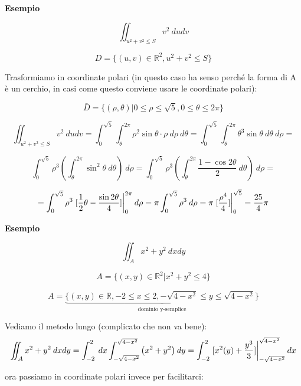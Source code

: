 \documentclass[../appunti-analisi.tex]{subfiles}
\begin{document}
%
%
%
%
%
%


\textbf{Esempio} 

\[
    \iint_{u^{2}+v^{2} \le S} {v^{2}} \: dudv 
\]

\[
    D= \{(u,v) \in \mathbb{R}^{2}, u^{2}+v^{2} \le S\}
\]

Trasformiamo in coordinate polari (in questo caso ha senso perché la forma di A è un cerchio, in casi come questo conviene usare le coordinate polari):

\[
    \bar{D} = \{(\rho,\theta) | 0 \le \rho \le \sqrt{5}, 0 \le \theta \le 2\pi\}
\]

\[
    \iint_{u^{2}+v^{2} \le S} {v ^{2}} \: dudv = \int_{0}^{\sqrt{5}} {\int_{\theta}^{2\pi} {\rho^{2} \sin \theta \cdot \rho} \: d \rho } \: d \theta = \int_{0}^{\sqrt{5}} {\int_{\theta}^{2\pi} {\theta^{3} \sin \theta} \: d \theta } \: d \rho =  
\]

\[
    \int_{0}^{\sqrt{5}} {\rho^{3} \left(\int_{\theta}^{2\pi} {\sin ^{2} \theta} \: d \theta \right)} \: d \rho = \int_{0}^{\sqrt{5}} {\rho^{3} \left( \int_{\theta}^{2\pi} { \frac{1- \cos 2 \theta}{2}} \: d \theta \right)} \: d \rho =   
\]

\[
    = \int_{0}^{\sqrt{5}} {\rho^{3} \left.[ \frac{1}{2} \theta - \frac{\sin 2 \theta}{4}]\right\rvert_{0}^{2\pi} } \: d \rho = \pi \int_{0}^{\sqrt{5}} {\rho^{3}} \: d \rho  = \pi \left.[ \frac{\rho^{4}}{4}]\right\rvert_{0}^{\sqrt{5}}  = \frac{25}{4}\pi 
\]

\textbf{Esempio} 

\[
\iint_A {x^{2}+y^{2}} \: d x d y  
\]

\[
    A = \{(x,y) \in \mathbb{R}^{2} | x^{2} + y^{2} \le 4\}
\]

\[
    A = \underbrace{\{(x,y) \in \mathbb{R}, -2 \le x \le 2, - \sqrt{4-x^{2}} \le  y \le  \sqrt{4 -x^{2}}\}}_\text{dominio y-semplice}\]

Vediamo il metodo lungo (complicato che non va bene):
\[
    \iint_A {x^{2}+y^{2}} \: d x d y = \int_{-2}^{2} {} \: dx  \int_{-\sqrt{4-x^{2}}}^{\sqrt{4-x^{2}}} {\left(x^{2} + y^{2}\right)} \: d y  = \int_{-2}^{2} { \left.[x^{2}(y)+ \frac{y^{3}}{3}]\right\rvert_{-\sqrt{4-x^{2}}}^{\sqrt{4-x^{2}}} } \: dx 
\]

ora passiamo in coordinate polari invece per facilitarci:
\end{document}
